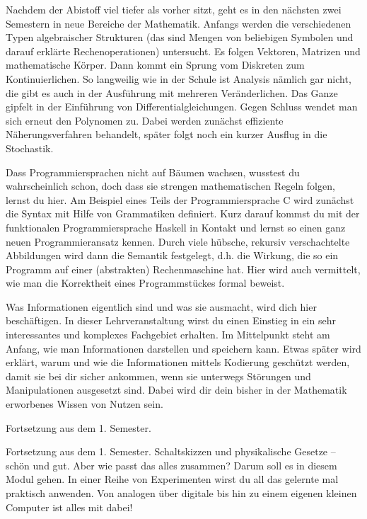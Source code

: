 \newpage


Nachdem der Abistoff viel tiefer als vorher sitzt, geht es in den nächsten zwei Semestern in neue Bereiche der Mathematik.
Anfangs werden die verschiedenen Typen algebraischer Strukturen (das sind Mengen von beliebigen Symbolen und darauf erklärte Rechenoperationen) untersucht.
Es folgen Vektoren, Matrizen und mathematische Körper.
Dann kommt ein Sprung vom Diskreten zum Kontinuierlichen.
So langweilig wie in der Schule ist Analysis nämlich gar nicht, die gibt es auch in der Ausführung mit mehreren Veränderlichen.
Das Ganze gipfelt in der Einführung von Differentialgleichungen.
Gegen Schluss wendet man sich erneut den Polynomen zu.
Dabei werden zunächst effiziente Näherungsverfahren behandelt, später folgt noch ein kurzer Ausflug in die Stochastik.

Dass Programmiersprachen nicht auf Bäumen wachsen, wusstest du wahrscheinlich schon, doch dass sie strengen mathematischen Regeln folgen, lernst du hier.
Am Beispiel eines Teils der Programmiersprache C wird zunächst die Syntax mit Hilfe von Grammatiken definiert.
Kurz darauf kommst du mit der funktionalen Programmiersprache Haskell in Kontakt und lernst so einen ganz neuen Programmieransatz kennen.
Durch viele hübsche, rekursiv verschachtelte Abbildungen wird dann die Semantik festgelegt, d.h. die Wirkung, die so ein Programm auf einer (abstrakten) Rechenmaschine hat.
Hier wird auch vermittelt, wie man die Korrektheit eines Programmstückes formal beweist.

Was Informationen eigentlich sind und was sie ausmacht, wird dich hier beschäftigen.
In dieser Lehrveranstaltung wirst du einen Einstieg in ein sehr interessantes und komplexes Fachgebiet erhalten.
Im Mittelpunkt steht am Anfang, wie man Informationen darstellen und speichern kann.
Etwas später wird erklärt, warum und wie die Informationen mittels Kodierung geschützt werden, damit sie bei dir sicher ankommen, wenn sie unterwegs Störungen und Manipulationen ausgesetzt sind.
Dabei wird dir dein bisher in der Mathematik erworbenes Wissen von Nutzen sein.

Fortsetzung aus dem 1. Semester.

\newpage

Fortsetzung aus dem 1. Semester. Schaltskizzen und physikalische Gesetze -- schön und gut. Aber wie passt das alles zusammen?
Darum soll es in diesem Modul gehen. In einer Reihe von Experimenten wirst du all das gelernte mal praktisch anwenden.
Von analogen über digitale bis hin zu einem eigenen kleinen Computer ist alles mit dabei!


